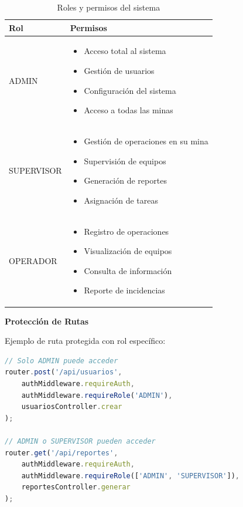 \documentclass[12pt,a4paper]{article}
\begin{document}
\begin{table}[H]
\centering
\begin{tabular}{|l|p{10cm}|}
\hline
\textbf{Rol} & \textbf{Permisos} \\
\hline
ADMIN &
\begin{itemize}[leftmargin=*]
    \item Acceso total al sistema
    \item Gestión de usuarios
    \item Configuración del sistema
    \item Acceso a todas las minas
\end{itemize} \\
\hline
SUPERVISOR &
\begin{itemize}[leftmargin=*]
    \item Gestión de operaciones en su mina
    \item Supervisión de equipos
    \item Generación de reportes
    \item Asignación de tareas
\end{itemize} \\
\hline
OPERADOR &
\begin{itemize}[leftmargin=*]
    \item Registro de operaciones
    \item Visualización de equipos
    \item Consulta de información
    \item Reporte de incidencias
\end{itemize} \\
\hline
\end{tabular}
\caption{Roles y permisos del sistema}
\end{table}

\textbf{Protección de Rutas}

Ejemplo de ruta protegida con rol específico:

\begin{lstlisting}[language=javascript, caption=Protección con requireRole]
// Solo ADMIN puede acceder
router.post('/api/usuarios',
    authMiddleware.requireAuth,
    authMiddleware.requireRole('ADMIN'),
    usuariosController.crear
);

// ADMIN o SUPERVISOR pueden acceder
router.get('/api/reportes',
    authMiddleware.requireAuth,
    authMiddleware.requireRole(['ADMIN', 'SUPERVISOR']),
    reportesController.generar
);
\end{lstlisting}
\end{document}
